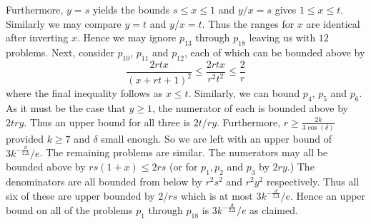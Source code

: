 \documentclass[10pt,a4paper]{article}
\theoremstyle{definition}
\begin{document}
Furthermore, $y=s$ yields the bounds $s \leq x \leq 1$ and $y/x = s$ gives $1 \leq x \leq t$.
Similarly we may compare $y=t$ and $y/x = t$.
Thus the ranges for $x$ are identical after inverting $x$.
Hence we may ignore $p_{13}$ through $p_{18}$ leaving us with $12$ problems.
%
Next, consider $p_{10}$, $p_{11}$ and $p_{12}$, each of which can be bounded above by
$$
\frac{2rtx}{(x+rt+1)^2} \leq \frac{2rtx}{r^2t^2} \leq \frac{2}{r}
$$
where the final inequality follows as $x \leq t$.
%
Similarly, we can bound $p_4$, $p_5$ and $p_6$.
As it must be the case that $y \geq 1$, the numerator of each is bounded above by $2try$.
Thus an upper bound for all three is $2t/ry$.
Furthermore, $r \geq \frac{2k}{3\cos(\delta)}$ provided $k\geq 7$ and $\delta$ small enough. So we are left with an upper bound of $3 k^{-\frac{d}{2\Delta}}/e$.
%
The remaining problems are similar.
The numerators may all be bounded above by $rs(1+x) \leq 2rs$ (or for $p_1, p_2$ and $p_3$ by $2ry$.)
The denominators are all bounded from below by $r^2s^2$ and $r^2y^2$ respectively.
Thus all six of these are upper bounded by $2/rs$ which is at most $3 k^{-\frac{d}{2\Delta}}/e$.
%
Hence an upper bound on all of the problems $p_1$ through $p_{18}$ is $3 k^{-\frac{d}{2\Delta}}/e$ as claimed.
%
\end{document}
